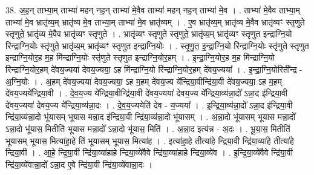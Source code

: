 \documentclass[17pt]{extarticle}
\begin{document}
38. अ॒ह॒न् ताभ्या॒म् ताभ्या॑ महन् नह॒न् ताभ्या॑ मे॒वैव ताभ्या॑ महन् नह॒न् ताभ्या॑ मे॒व । . ताभ्या॑ मे॒वैव ताभ्या॒म् ताभ्या॑ मे॒व भ्रातृ॑व्य॒म् भ्रातृ॑व्य मे॒व ताभ्या॒म् ताभ्या॑ मे॒व भ्रातृ॑व्यम् । . ए॒व भ्रातृ॑व्य॒म् भ्रातृ॑व्य मे॒वैव भ्रातृ॑व्यꣳ स्तृणुते स्तृणुते॒ भ्रातृ॑व्य मे॒वैव भ्रातृ॑व्यꣳ स्तृणुते । . भ्रातृ॑व्यꣳ स्तृणुते स्तृणुते॒ भ्रातृ॑व्य॒म् भ्रातृ॑व्यꣳ स्तृणुत इन्द्राग्नि॒यो रि॑न्द्राग्नि॒योः स्तृ॑णुते॒ भ्रातृ॑व्य॒म् भ्रातृ॑व्यꣳ स्तृणुत इन्द्राग्नि॒योः । . स्तृ॒णु॒त॒ इ॒न्द्रा॒ग्नि॒यो रि॑न्द्राग्नि॒योः स्तृ॑णुते स्तृणुत इन्द्राग्नि॒योर॒ह म॒ह मि॑न्द्राग्नि॒योः स्तृ॑णुते स्तृणुत इन्द्राग्नि॒योर॒हम् । . इ॒न्द्रा॒ग्नि॒योर॒ह म॒ह मि॑न्द्राग्नि॒यो रि॑न्द्राग्नि॒योर॒हम् दे॑वय॒ज्यया॑ देवय॒ज्यया॒ ऽह मि॑न्द्राग्नि॒यो रि॑न्द्राग्नि॒योर॒हम् दे॑वय॒ज्यया᳚ । . इ॒न्द्रा॒ग्नि॒योरिती᳚न्द्र - अ॒ग्नि॒योः । . अ॒हम् दे॑वय॒ज्यया॑ देवय॒ज्यया॒ ऽह म॒हम् दे॑वय॒ज्य ये᳚न्द्रिया॒वीन्द्रि॑या॒वी दे॑वय॒ज्यया॒ ऽह म॒हम् दे॑वय॒ज्यये᳚न्द्रिया॒वी । . दे॒व॒य॒ज्य ये᳚न्द्रिया॒वीन्द्रि॑या॒वी दे॑वय॒ज्यया॑ देवय॒ज्य ये᳚न्द्रिया॒व्य॑न्ना॒दो᳚ ऽन्ना॒द इ॑न्द्रिया॒वी दे॑वय॒ज्यया॑ देवय॒ज्य ये᳚न्द्रिया॒व्य॑न्ना॒दः । . दे॒व॒य॒ज्ययेति॑ देव - य॒ज्यया᳚ । . इ॒न्द्रि॒या॒व्य॑न्ना॒दो᳚ ऽन्ना॒द इ॑न्द्रिया॒वी न्द्रि॑या॒व्य॑न्ना॒दो भू॑यासम् भूयास मन्ना॒द इ॑न्द्रिया॒वी न्द्रि॑या॒व्य॑न्ना॒दो भू॑यासम् । . अ॒न्ना॒दो भू॑यासम् भूयास मन्ना॒दो᳚ ऽन्ना॒दो भू॑यास॒ मितीति॑ भूयास मन्ना॒दो᳚ ऽन्ना॒दो भू॑यास॒ मिति॑ । . अ॒न्ना॒द इत्य॑न्न - अ॒दः । . भू॒या॒स॒ मितीति॑ भूयासम् भूयास॒ मित्या॑हा॒हे ति॑ भूयासम् भूयास॒ मित्या॑ह । . इत्या॑हा॒हे तीत्या॑हे न्द्रिया॒वी न्द्रि॑या॒व्या॑हे तीत्या॑हे न्द्रिया॒वी । . आ॒हे॒ न्द्रि॒या॒वी न्द्रि॑या॒व्या॑हाहे न्द्रिया॒व्ये॑वैवे न्द्रि॑या॒व्या॑हाहे न्द्रिया॒व्ये॑व । . इ॒न्द्रि॒या॒व्ये॑वैवे न्द्रि॑या॒वी न्द्रि॑या॒व्ये॑वान्ना॒दो᳚ ऽन्ना॒द ए॒वे न्द्रि॑या॒वी न्द्रि॑या॒व्ये॑वान्ना॒दः । \newline
\end{document}
